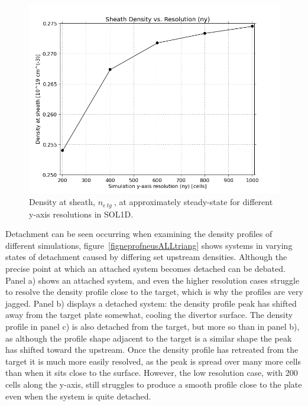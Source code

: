 \documentclass[12pt]{article}  %
\providecommand{\netg}{$n_{e~tg}~$} %
\begin{document}
\begin{figure}
	\includegraphics[scale=0.48]{Figures/sol1d/RE_neres1000.png}
	\centering
	\caption{Density at sheath, \netg, at approximately steady-state for different y-axis resolutions in SOL1D.}\label{figRE_neres1000}
\end{figure}

Detachment can be seen occurring when examining the density profiles of different simulations, figure~\ref{figneprofneusALLtriang} shows systems in varying states of detachment caused by differing set upstream densities. Although the precise point at which an attached system becomes detached can be debated. Panel a) shows an attached system, and even the higher resolution cases struggle to resolve the density profile close to the target, which is why the profiles are very jagged. Panel b) displays a detached system: the density profile peak has shifted away from the target plate somewhat, cooling the divertor surface. The density profile in panel c) is also detached from the target, but more so than in panel b), as although the profile shape adjacent to the target is a similar shape the peak has shifted toward the upstream. Once the density profile has retreated from the target it is much more easily resolved, as the peak is spread over many more cells than when it sits close to the surface. However, the low resolution case, with 200 cells along the y-axis, still struggles to produce a smooth profile close to the plate even when the system is quite detached. 
\end{document}

